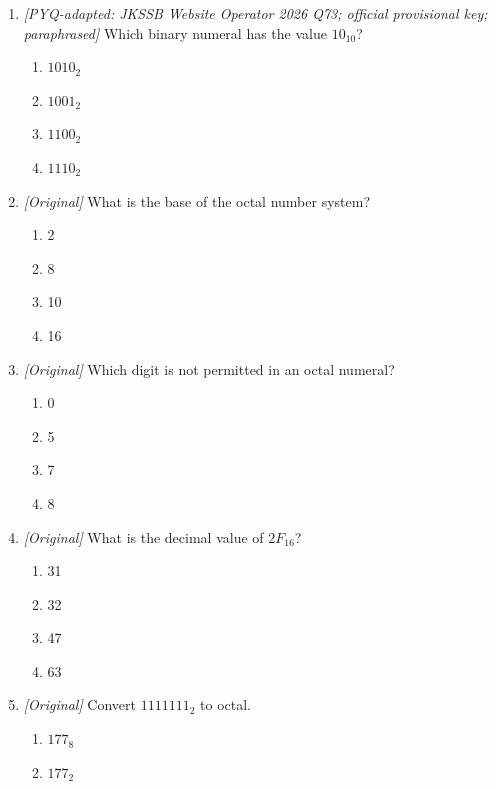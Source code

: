 \documentclass[11pt]{article}
\begin{document}
\begin{enumerate}[label=\textbf{Q\arabic*.}, leftmargin=*]
$278_{10}$?
  \begin{enumerate}[label=\Alph*.]
    \item $100010110_2$
    \item $101010110_2$
    \item $100110110_2$
    \item $110010110_2$
  \end{enumerate}
\item \textit{[PYQ-adapted: JKSSB Website Operator 2026 Q73; official
provisional key; paraphrased]} Which binary numeral has the value
$10_{10}$?
  \begin{enumerate}[label=\Alph*.]
    \item $1010_2$
    \item $1001_2$
    \item $1100_2$
    \item $1110_2$
  \end{enumerate}
\item \textit{[Original]} What is the base of the octal number system?
  \begin{enumerate}[label=\Alph*.]
    \item 2
    \item 8
    \item 10
    \item 16
  \end{enumerate}
\item \textit{[Original]} Which digit is not permitted in an octal numeral?
  \begin{enumerate}[label=\Alph*.]
    \item 0
    \item 5
    \item 7
    \item 8
  \end{enumerate}
\item \textit{[Original]} What is the decimal value of $2F_{16}$?
  \begin{enumerate}[label=\Alph*.]
    \item 31
    \item 32
    \item 47
    \item 63
  \end{enumerate}
\item \textit{[Original]} Convert $1111111_2$ to octal.
  \begin{enumerate}[label=\Alph*.]
    \item $177_8$
    \item $177_2$

\end{enumerate}
\end{enumerate}
\end{document}
